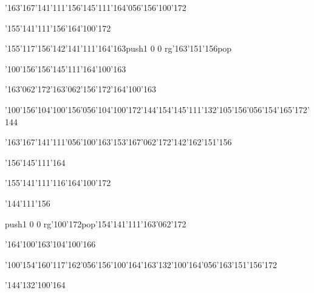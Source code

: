 \null\vfill\ipa\centerline{\enskip\enskip\enskip\enskip\char'163\char'167\char'141\char'111\enskip\enskip\enskip\enskip\char'156\char'145\char'111\char'164\char'056\char'156\char'100\char'172}\medskip\centerline{\enskip\enskip\enskip\enskip\char'155\char'141\char'111\char'156\enskip\char'164\char'100\char'172\enskip\enskip\enskip\enskip}\medskip\centerline{\enskip\enskip\char'155\char'117\char'156\enskip\enskip\char'142\char'141\char'111\char'164\char'163\enskip\enskip\enskip\enskip\pdfcolorstack\match push{1 0 0 rg}\char'163\char'151\char'156\pdfcolorstack\match pop{}}\medskip\centerline{\enskip\char'100\char'156\enskip\char'156\char'145\char'111\enskip\enskip\enskip\enskip\char'164\char'100\char'163}\medskip\centerline{\enskip\char'163\char'062\char'172\enskip\char'163\char'062\char'156\char'172\enskip\enskip\enskip\enskip\enskip\enskip\enskip\enskip\enskip\enskip\enskip\enskip\char'164\char'100\char'163}\medskip\centerline{\enskip\char'100\char'156\enskip\char'104\char'100\char'156\char'056\char'104\char'100\char'172\char'144\enskip\char'154\char'145\char'111\enskip\char'132\char'105\char'156\char'056\char'154\char'165\char'172\char'144}\medskip\centerline{\enskip\char'163\char'167\char'141\char'111\char'056\char'100\char'163\enskip\enskip\enskip\enskip\enskip\enskip\char'153\char'167\char'062\char'172\enskip\enskip\enskip\enskip\enskip\char'142\char'162\char'151\char'156}\medskip\vfill\footline{\hfil\tt\folio\hfil}\eject
\null\vfill\ipa\centerline{\enskip\enskip\enskip\enskip\enskip\enskip\enskip\enskip\enskip\enskip\enskip\char'156\char'145\char'111\char'164\enskip\enskip\enskip\enskip}\medskip\centerline{\enskip\enskip\enskip\enskip\char'155\char'141\char'111\char'116\enskip\enskip\enskip\enskip\char'164\char'100\char'172}\medskip\centerline{\enskip\enskip\enskip\enskip\enskip\enskip\enskip\enskip\enskip\enskip\enskip\enskip\enskip\enskip\enskip\char'144\char'111\char'156}\medskip\centerline{\enskip\pdfcolorstack\match push{1 0 0 rg}\char'100\char'172\pdfcolorstack\match pop{}\enskip\char'154\char'141\char'111\enskip\enskip\enskip\enskip\char'163\char'062\char'172}\medskip\centerline{\enskip\char'164\char'100\char'163\enskip\enskip\enskip\enskip\enskip\enskip\enskip\char'104\char'100\char'166\enskip\enskip\enskip\enskip\enskip\enskip\enskip\enskip\enskip\enskip}\medskip\centerline{\enskip\char'100\char'154\enskip\char'160\char'117\char'162\char'056\char'156\char'100\char'164\char'163\enskip\enskip\enskip\enskip\enskip\char'132\char'100\char'164\char'056\char'163\char'151\char'156\char'172}\medskip\centerline{\enskip\enskip\enskip\enskip\enskip\enskip\enskip\enskip\enskip\enskip\enskip\enskip\enskip\enskip\enskip\enskip\enskip\enskip\enskip\enskip\enskip\char'144\char'132\char'100\char'164}\medskip\vfill\footline{\hfil\tt\folio\hfil}\eject
